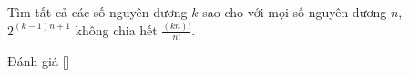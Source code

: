 \ifshowproblem
\begin{problem}\label{problem:CHN-2015-NML-P4}
    Tìm tất cả các số nguyên dương $k$ sao cho với mọi số nguyên dương $n$, $2^{(k-1)n+1}$ không chia hết $\frac{(kn)!}{n!}$.
\end{problem}
\fi

\ifshowinfo
Đánh giá [\textbf{}]\footnotemark
{}
\fi